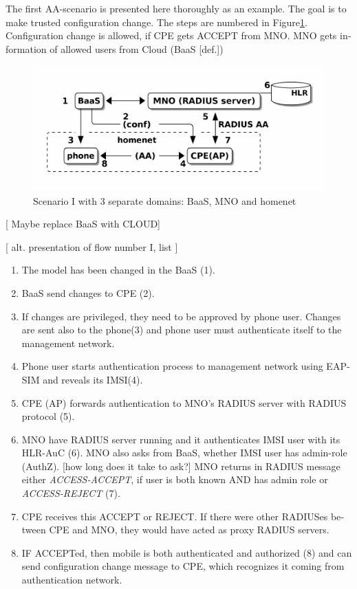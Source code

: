 \documentclass[12pt,a4paper,english]{tutthesis}
\begin{document}
\begin{otherlanguage}{english}
\label{scenario-i}
The first AA-scenario is presented here thoroughly as an example.
The goal is to make trusted configuration change. 
The steps are numbered in Figure\ref{fig:scenario-I}.
Configuration change is allowed, if CPE gets ACCEPT from MNO.  MNO gets
information of allowed users from Cloud (BaaS [def.])


\begin{figure}[htb]
\centering
\includegraphics[width=.9\linewidth]{scenI.png}
\caption{\label{fig:scenario-I}Scenario I with 3 separate domains: BaaS, MNO and homenet}
\end{figure}

[ Maybe replace BaaS with CLOUD] 


[ alt. presentation of flow number I, list ] 

\begin{enumerate}
\item The model has been changed in the BaaS (1).
\item BaaS send changes to CPE (2).
\item If changes are privileged, they need to be approved by phone user.
Changes are sent also to the phone(3) and phone user must authenticate
itself to the management network.
\item Phone user starts authentication process to management
network using EAP-SIM and reveals its IMSI(4).
\item CPE  (AP) forwards authentication to MNO's RADIUS server with
RADIUS protocol (5).
\item MNO have RADIUS server running and it authenticates IMSI user with
  its HLR-AuC (6).
MNO also asks from BaaS, whether IMSI user has admin-role (AuthZ). [how long does it take to ask?]
MNO returns in RADIUS message either \emph{ACCESS-ACCEPT}, if user is both known AND has admin role 
  or \emph{ACCESS-REJECT} (7).
\item CPE receives this ACCEPT or REJECT. If there were other RADIUSes
between CPE and MNO, they would have acted
as proxy RADIUS servers.
\item IF ACCEPTed, then mobile is both authenticated and authorized (8) and
can send configuration change message to CPE, which recognizes it
coming from authentication network.
\end{enumerate}




\end{otherlanguage}
\end{document}
